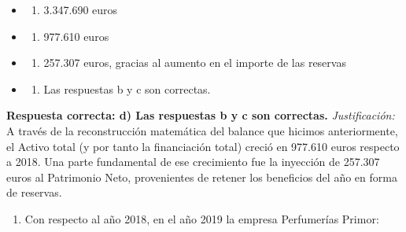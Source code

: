 \documentclass[12pt]{book} %
\providecommand{\tightlist}{%
  \setlength{\itemsep}{0pt}\setlength{\parskip}{0pt}}
\begin{document}
\begin{itemize}
\item
  \begin{enumerate}
  \def\labelenumi{\alph{enumi})}
  \tightlist
  \item
    3.347.690 euros
  \end{enumerate}
\item
  \begin{enumerate}
  \def\labelenumi{\alph{enumi})}
  \setcounter{enumi}{1}
  \tightlist
  \item
    977.610 euros
  \end{enumerate}
\item
  \begin{enumerate}
  \def\labelenumi{\alph{enumi})}
  \setcounter{enumi}{2}
  \tightlist
  \item
    257.307 euros, gracias al aumento en el importe de las reservas
  \end{enumerate}
\item
  \begin{enumerate}
  \def\labelenumi{\alph{enumi})}
  \setcounter{enumi}{3}
  \tightlist
  \item
    Las respuestas b y c son correctas.
  \end{enumerate}
\end{itemize}

\textbf{Respuesta correcta: d) Las respuestas b y c son correctas.}
\emph{Justificación:} A través de la reconstrucción matemática del
balance que hicimos anteriormente, el Activo total (y por tanto la
financiación total) creció en 977.610 euros respecto a 2018. Una parte
fundamental de ese crecimiento fue la inyección de 257.307 euros al
Patrimonio Neto, provenientes de retener los beneficios del año en forma
de reservas.

\begin{enumerate}
\def\labelenumi{\arabic{enumi}.}
\setcounter{enumi}{1}
\tightlist
\item
  Con respecto al año 2018, en el año 2019 la empresa Perfumerías
  Primor:
\end{enumerate}
\end{document}
